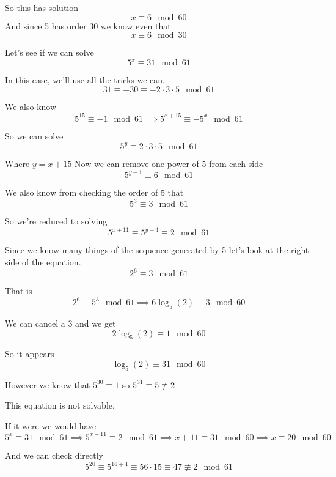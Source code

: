 \documentclass[16 pt]{amsart}
\theoremstyle{definition}
\theoremstyle{remark}
\numberwithin{equation}{subsection}
\begin{document}
So this has solution
\[
x \equiv 6 \mod{60}
\]
And since 5 has order 30 we know even that
\[
x\equiv 6 \mod{30}
\]


Let's see if we can solve
\[
5^x \equiv 31 \mod{61}
\]


In this case, we'll use all the tricks we can.
\[
31 \equiv -30 \equiv -2\cdot 3\cdot 5 \mod{61}
\]

We also know
\[
5^{15} \equiv -1 \mod{61}  \implies 5^{x+15} \equiv -5^x \mod{61}
\]

So we can solve
\[
5^y \equiv 2\cdot 3\cdot 5 \mod{61}
\]

Where $y=x+15$
Now we can remove one power of 5 from each side
\[
5^{y-1} \equiv 6 \mod{61}
\]

We also know from checking the order of 5 that
\[
5^3 \equiv 3 \mod{61}
\]

So we're reduced to solving
\[
5^{x+11} \equiv 5^{y-4} \equiv 2 \mod{61} 
\]

Since we know many things of the sequence generated by 5 let's look at the right side of the equation.
\[
2^6 \equiv 3 \mod{61}
\]

That is
\[
2^6 \equiv 5^3 \mod{61} \implies 6 \log_{5}(2) \equiv 3 \mod{60}
\]

We can cancel a 3 and we get
\[
2\log_{5}(2) \equiv 1 \mod{60}
\]

So it appears 
\[
\log_{5}(2) \equiv 31 \mod{60}
\]

However we know that $5^{30} \equiv 1$ so $5^{31}\equiv 5 \not\equiv 2$

This equation is not solvable.

If it were we would have
\[
5^x \equiv 31 \mod{61} \implies 5^{x+11} \equiv 2 \mod{61} \implies x+11 \equiv 31 \mod{60} \implies x\equiv 20 \mod{60}
\]

And we can check directly
\[
5^{20} \equiv 5^{16+4} \equiv 56\cdot 15 \equiv 47 \not\equiv 2 \mod{61}
\]
\end{document}

